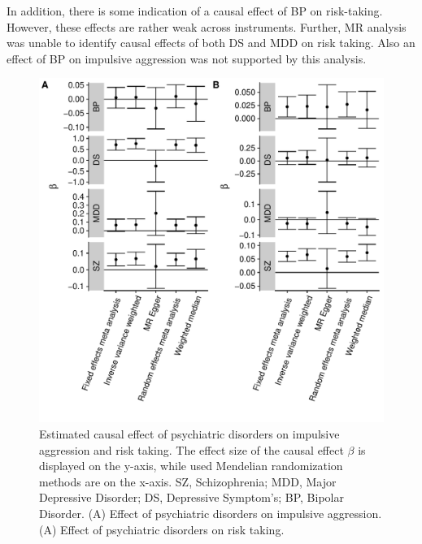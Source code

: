 In addition, there is some indication of a causal effect of BP on risk-taking.
However, these effects are rather weak across instruments.
Further, MR analysis was unable to identify causal effects of both DS and MDD on risk taking.
Also an effect of BP on impulsive aggression was not supported by this analysis.
\begin{figure}[htpb]
  \centering
  \includegraphics[width=0.9\linewidth]{ukb_psychiatric/figures/overall_mr_effect.pdf}
  \caption[Estimated Causal Effects]{
    Estimated causal effect of psychiatric disorders on impulsive aggression and risk taking.
    The effect size of the causal effect $\beta$ is displayed on the y-axis, while used Mendelian randomization methods are on the x-axis.
    SZ, Schizophrenia; MDD, Major Depressive Disorder; DS, Depressive Symptom's; BP, Bipolar Disorder.
    (A) Effect of psychiatric disorders on impulsive aggression.
    (A) Effect of psychiatric disorders on risk taking.
  }\label{fig:overall_mr_effect}
\end{figure}

